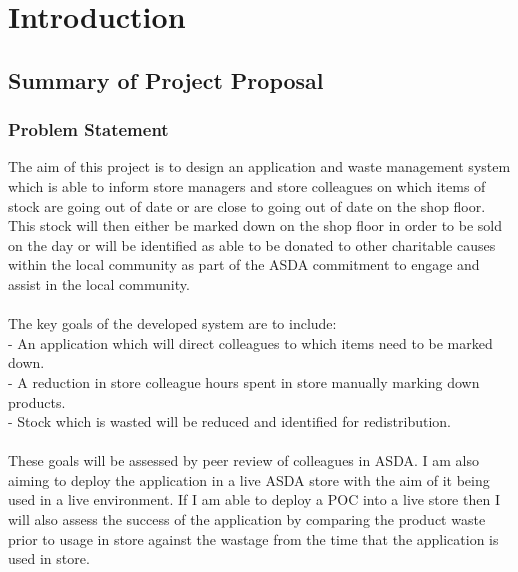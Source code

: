 \documentclass[a4paper,11pt]{report}
\begin{document}



\chapter{Introduction}\label{chap:intro}

\section{Summary of Project Proposal}

\subsection{Problem Statement}\label{sec:problem}
The aim of this project is to design an application and waste management system which is able
to inform store managers and store colleagues on which items of stock are going out of date or are
close to going out of date on the shop floor. This stock will then either be marked 
down on the shop floor in order to be sold on the day or will be identified as able to be donated to other charitable
causes within the local community as part of the ASDA commitment to engage and assist in the local community.
\\
\\
The key goals of the developed system are to include:
\\
- An application which will direct colleagues to which items need to be marked down.
\\
- A reduction in store colleague hours spent in store manually marking down products.
\\
- Stock which is wasted will be reduced and identified for redistribution.
\\
\\
These goals will be assessed by peer review of colleagues in ASDA. I am also aiming to 
deploy the application in a live ASDA store with the aim of it being used in a live environment.
If I am able to deploy a POC into a live store then I will also assess the success of the 
application by comparing the product waste prior to usage in store against the wastage from 
the time that the application is used in store. 
\end{document}
